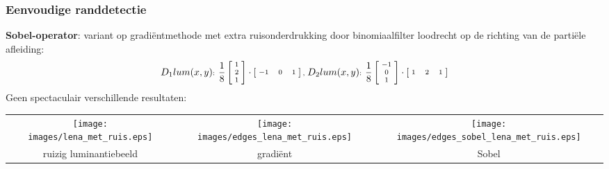 \documentclass[dutch]{beamer}
\theoremstyle{definition}
\theoremstyle{remark}
\theoremstyle{example}
\begin{document}
{
  \frametitle{Eenvoudige randdetectie}
  
  \textbf{Sobel-operator}: variant op gradi\"entmethode met extra ruisonderdrukking
  door binomiaalfilter loodrecht op de richting van de parti\"ele afleiding:
  \begin{displaymath}
  \scriptsize
  D_1 lum(x,y)\text{: } \frac{1}{8} \left[ \begin{array}{@{\ }c@{\ }} 1 \\ 2 \\ 1 \end{array} \right] \cdot \left[ \begin{array}{@{\ }ccc@{\ }} -1 & 0 & 1 \end{array} \right] \text{, } 
  D_2 lum(x,y)\text{: } \frac{1}{8} \left[ \begin{array}{@{\ }c@{\ }} -1 \\ 0 \\ 1 \end{array} \right] \cdot \left[ \begin{array}{@{\ }ccc@{\ }} 1 & 2 & 1 \end{array} \right]
  \end{displaymath}
  Geen spectaculair verschillende resultaten:
  \begin{center}
  \begin{tabular}{@{}c@{\ }c@{\ }c@{}}
  \texttt{[image: images/lena\_met\_ruis.eps]} &
  \texttt{[image: images/edges\_lena\_met\_ruis.eps]} &
  \texttt{[image: images/edges\_sobel\_lena\_met\_ruis.eps]}\\
  {\scriptsize ruizig luminantiebeeld} & {\scriptsize gradi\"ent} & {\scriptsize Sobel}
  \end{tabular}
  \end{center}
}
\end{document}
